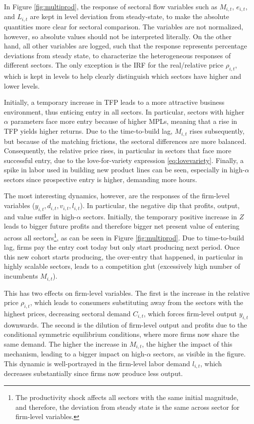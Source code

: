 \documentclass[a4paper,12pt]{article} %
\numberwithin{equation}{section} %
\numberwithin{figure}{section}
\numberwithin{table}{section}
\begin{document}
In Figure \ref{fig:multiprod}, the response of sectoral flow variables such as $M_{i,t}$, $e_{i,t}$, and $L_{i,t}$ are kept in level
deviation from steady-state, to make the absolute quantities more clear for sectoral comparison. The variables are not normalized, however,
so absolute values should not be interpreted literally. On the other hand, all other
variables are logged, such that the response represents percentage deviations from steady state, to characterize the heterogeneous
responses of different sectors. The only exception is the IRF for the real/relative price $\rho_{i,t}$, which is 
kept in levels to help clearly distinguish which sectors have higher and lower levels.

Initially, a temporary increase in TFP leads to a more attractive business environment, thus enticing
entry in all sectors. In particular, sectors with higher $\alpha$ parameters face more entry because of higher MPLs,
meaning that a rise in TFP yields higher returns. Due to the time-to-build lag, $M_{i,t}$ rises subsequently, but because
of the matching frictions, the sectoral differences are more balanced. Consequently, the relative price rises, in particular in
sectors that face more successful entry, due to the love-for-variety expression \eqref{eq:lovevariety}. Finally, a spike in
labor used in building new product lines can be seen, especially in high-$\alpha$ sectors since prospective entry is higher, demanding more
hours.

The most interesting dynamics, however, are the responses of the firm-level variables ($y_{i,t},d_{i,t},v_{i,t},l_{i,t}$). In particular, the
negative dip that profits, output, and value suffer in high-$\alpha$ sectors. Initially, the temporary positive 
increase in $Z$ leads to bigger future profits and therefore bigger net present value of entering across all sectors\footnote{The productivity shock affects
all sectors with the same initial magnitude, and therefore, the deviation from steady state is the same across sector for firm-level variables.}, as can be
seen in Figure \ref{fig:multiprod}. Due to time-to-build lag, firms pay the entry cost today but only start producing
next period. Once this new cohort starts producing, the over-entry that happened, in particular in highly scalable sectors, leads
to a competition glut (excessively high number of incumbents $M_{i,t}$). 

This has two effects on firm-level variables. The first is the
increase in the relative price $\rho_{i,t}$, which leads to consumers substituting away from the sectors with the highest prices, decreasing
sectoral demand $C_{i,t}$, which forces firm-level output $y_{i,t}$ downwards. The second is the dilution of
firm-level output and profits due to the conditional symmetric equilibrium conditions, where more firms now share the same demand.
The higher the increase in $M_{i,t}$, the higher the impact of this mechanism, leading to a bigger impact on high-$\alpha$ sectors, as visible
in the figure. This dynamic is well-portrayed in the firm-level labor demand $l_{i,t}$, which decreases substantially since firms now produce 
less output.
\end{document}
